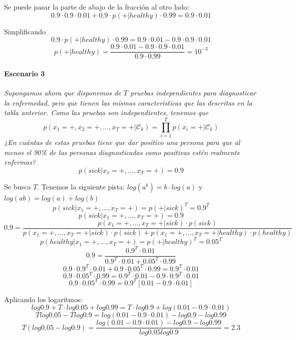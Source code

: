 Se puede pasar la parte de abajo de la fracción al otro lado:
$$0.9 \cdot 0.9 \cdot 0.01 + 0.9 \cdot p(+|healthy) \cdot 0.99 = 0.9 \cdot 0.01$$

Simplificando
$$0.9 \cdot p(+|healthy) \cdot 0.99 = 0.9 \cdot 0.01 - 0.9 \cdot 0.9 \cdot 0.01 $$
$$ p(+|healthy) = \frac{0.9 \cdot 0.01 - 0.9 \cdot 0.9 \cdot 0.01}{0.9 \cdot 0.99} = 10^{-3}$$
 
\paragraph{Escenario 3}
\textit{Supongamos ahora que disponemos de $T$ pruebas independientes para diagnosticar la enfermedad, pero que tienen las mismas características que las descritas en la tabla anterior. Como las pruebas son independientes, tenemos que }
$$ p(x_1=\text{+},x_2=\text{+},\ldots, x_T = \text{+}|\mathcal{C}_k)=\prod_{i=1}^T p(x_i=\text{+}|\mathcal{C}_k)$$
\textit{¿En cuántas de estas pruebas tiene que dar positivo una persona para que al menos el 90\% de las personas diagnosticadas como positivas estén realmente enfermas?}
$$p(sick | x_1 = +, ..., x_T = +) = 0.9$$

Se busca $T$. Tenemos la siguiente pista: $log(a^b) = b \cdot log(a)$ y $log(ab) = log(a) + log(b)$
$$p(sick | x_1 = +, ..., x_T = +) = p(+ | sick)^T = 0.9^T$$
$$p(sick | x_1 = +, ..., x_T = +) = 0.9 $$
$$0.9 = \frac{p(x_1 = +, ..., x_T = + | sick) \cdot p(sick)}{p(x_1 = +, ..., x_T = + | sick) \cdot p(sick) + p(x_1 = +, ..., x_T = + | healthy) \cdot p(healthy)}$$
$$p(healthy | x_1 = +, ..., x_T = +) = p(+ | healthy)^T = 0.05^T$$
$$0.9 = \frac{0.9^T \cdot 0.01}{0.9^T \cdot 0.01 + 0.05^T \cdot 0.99}$$
$$0.9 \cdot 0.9^T \cdot 0.01 + 0.9 \cdot 0.05^T \cdot 0.99 = 0.9^T \cdot 0.01$$
$$0.9 \cdot 0.05^T \cdot 0.99 = 0.9^T \cdot 0.01 - 0.9 \cdot 0.9^T \cdot 0.01$$
$$0.9 \cdot 0.05^T \cdot 0.99 = 0.9^T[0.01 - 0.9 \cdot 0.01]$$

Aplicando los logaritmos:
$$log 0.9 + T \cdot log 0.05 + log 0.99 = T \cdot log 0.9 + log(0.01 - 0.9 \cdot 0.01)$$
$$T log 0.05 - T log 0.9 = log(0.01 - 0.9 \cdot 0.01) - log 0.9 - log 0.99$$
$$T(log 0.05 - log 0.9) = \frac{log(0.01 - 0.9 \cdot 0.01) - log 0.9 - log 0.99}{log 0.05  log 0.9} = 2.3$$

